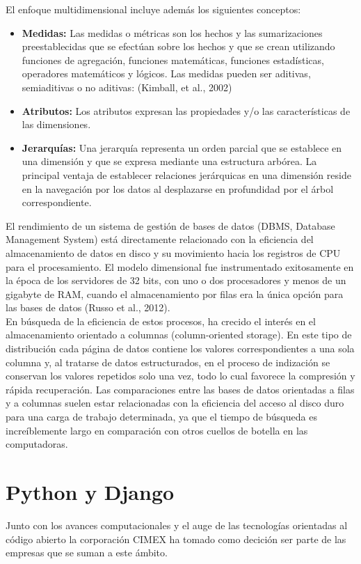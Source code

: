 

El enfoque multidimensional incluye además los siguientes conceptos:
\begin{itemize}
\item \textbf{Medidas:} Las medidas o métricas son los hechos y las sumarizaciones preestablecidas que se efectúan sobre los hechos y que se crean utilizando funciones de agregación, funciones matemáticas, funciones estadísticas, operadores matemáticos y lógicos. Las medidas pueden ser aditivas, semiaditivas o no aditivas: (Kimball, et al., 2002)
\item \textbf{Atributos:} Los atributos expresan las propiedades y/o las características de las dimensiones. 
\item \textbf{Jerarquías:} Una jerarquía representa un orden parcial que se establece en una dimensión y que se expresa mediante una estructura arbórea. La principal ventaja de establecer relaciones jerárquicas en una dimensión reside en la navegación por los datos al desplazarse en profundidad por el árbol correspondiente.
\end{itemize}

El rendimiento de un sistema de gestión de bases de datos (DBMS, Database Management System) está directamente relacionado con la eficiencia del almacenamiento de datos en disco y su movimiento hacia los registros de CPU para el procesamiento. El modelo dimensional fue instrumentado exitosamente en la época de los servidores de 32 bits, con uno o dos procesadores y menos de un gigabyte de RAM, cuando el almacenamiento por filas era la única opción para las bases de datos (Russo et al., 2012). \\

En búsqueda de la eficiencia de estos procesos, ha crecido el interés en el almacenamiento orientado a columnas (column-oriented storage). En este tipo de distribución cada página de datos contiene los valores correspondientes a una sola columna y, al tratarse de datos estructurados, en el proceso de indización se conservan los valores repetidos solo una vez, todo lo cual favorece la compresión y rápida recuperación. Las comparaciones entre las bases de datos orientadas a filas y a columnas suelen estar relacionadas con la eficiencia del acceso al disco duro para una carga de trabajo determinada, ya que el tiempo de búsqueda es increíblemente largo en comparación con otros cuellos de botella en las computadoras.


\section*{Python y Django}\label{py_dj}
Junto con los avances computacionales y el auge de las tecnologías orientadas al código abierto la corporación CIMEX ha tomado como decición ser parte de las empresas que se suman a este ámbito.



